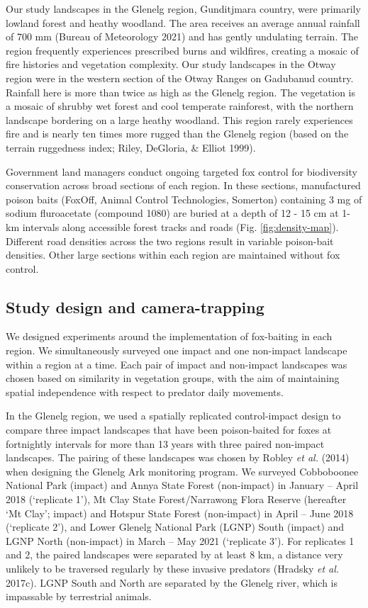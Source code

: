 \documentclass[11pt,a4paper,titlepage,twoside,openright]{style/unimelbthesis}
\begin{document}
\begin{mainmatter}
Our study landscapes in the Glenelg region, Gunditjmara country, were primarily lowland forest and heathy woodland. The area receives an average annual rainfall of 700 mm (Bureau of Meteorology 2021) and has gently undulating terrain. The region frequently experiences prescribed burns and wildfires, creating a mosaic of fire histories and vegetation complexity. Our study landscapes in the Otway region were in the western section of the Otway Ranges on Gadubanud country. Rainfall here is more than twice as high as the Glenelg region. The vegetation is a mosaic of shrubby wet forest and cool temperate rainforest, with the northern landscape bordering on a large heathy woodland. This region rarely experiences fire and is nearly ten times more rugged than the Glenelg region (based on the terrain ruggedness index; Riley, DeGloria, \& Elliot 1999).

Government land managers conduct ongoing targeted fox control for biodiversity conservation across broad sections of each region. In these sections, manufactured poison baits (FoxOff, Animal Control Technologies, Somerton) containing 3 mg of sodium fluroacetate (compound 1080) are buried at a depth of 12 - 15 cm at 1-km intervals along accessible forest tracks and roads (Fig. \ref{fig:density-map}). Different road densities across the two regions result in variable poison-bait densities. Other large sections within each region are maintained without fox control.

\hypertarget{study-design-and-camera-trapping}{%
\subsection{Study design and camera-trapping}\label{study-design-and-camera-trapping}}

We designed experiments around the implementation of fox-baiting in each region. We simultaneously surveyed one impact and one non-impact landscape within a region at a time. Each pair of impact and non-impact landscapes was chosen based on similarity in vegetation groups, with the aim of maintaining spatial independence with respect to predator daily movements.

In the Glenelg region, we used a spatially replicated control-impact design to compare three impact landscapes that have been poison-baited for foxes at fortnightly intervals for more than 13 years with three paired non-impact landscapes. The pairing of these landscapes was chosen by Robley \emph{et al.} (2014) when designing the Glenelg Ark monitoring program. We surveyed Cobboboonee National Park (impact) and Annya State Forest (non-impact) in January -- April 2018 (`replicate 1'), Mt Clay State Forest/Narrawong Flora Reserve (hereafter `Mt Clay'; impact) and Hotspur State Forest (non-impact) in April -- June 2018 (`replicate 2'), and Lower Glenelg National Park (LGNP) South (impact) and LGNP North (non-impact) in March -- May 2021 (`replicate 3'). For replicates 1 and 2, the paired landscapes were separated by at least 8 km, a distance very unlikely to be traversed regularly by these invasive predators (Hradsky \emph{et al.} 2017c). LGNP South and North are separated by the Glenelg river, which is impassable by terrestrial animals.


\end{mainmatter}
\end{document}
